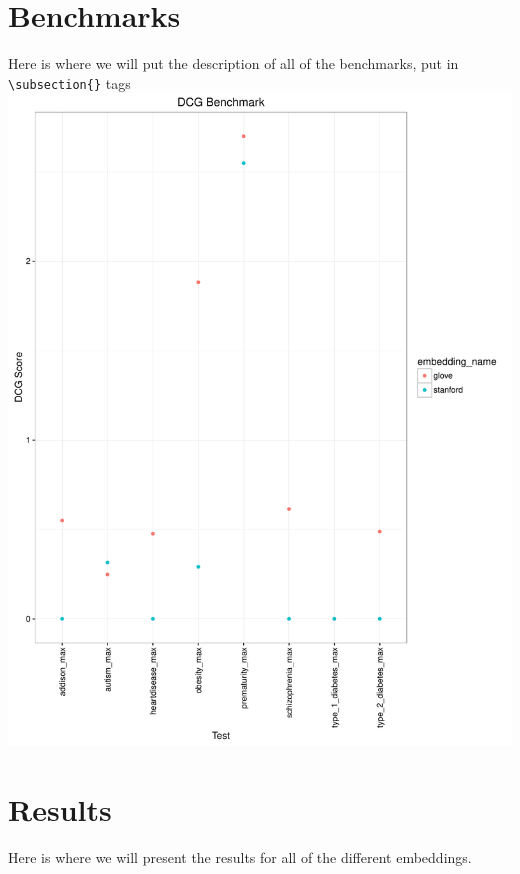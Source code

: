 \documentclass{ws-procs11x85}
\begin{document}
\section{Benchmarks}
Here is where we will put the description of all of the benchmarks, put in \verb|\subsection{}| tags
\includegraphics[scale=.5]{dcg_plot.pdf}

\section{Results}
Here is where we will present the results for all of the different embeddings.




\end{document}
